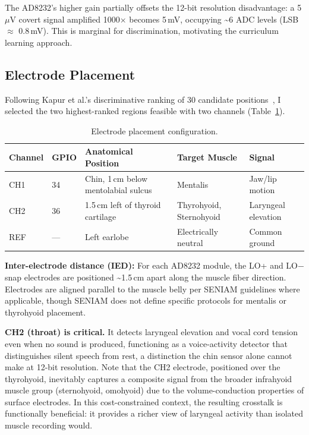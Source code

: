 \documentclass{article}
\begin{document}
The AD8232's higher gain partially offsets the 12-bit resolution disadvantage: a 5\,$\mu$V covert signal amplified 1000$\times$ becomes 5\,mV, occupying \textasciitilde6 ADC levels (LSB $\approx$ 0.8\,mV). This is marginal for discrimination, motivating the curriculum learning approach.

\subsection{Electrode Placement}

Following Kapur et al.'s discriminative ranking of 30 candidate positions~\cite{kapur2018}, I selected the two highest-ranked regions feasible with two channels (Table~\ref{tab:electrodes}).

\begin{table}[h]
\centering
\caption{Electrode placement configuration.}
\label{tab:electrodes}
\begin{tabular}{@{}lllll@{}}
\toprule
Channel & GPIO & Anatomical Position & Target Muscle & Signal \\
\midrule
CH1 & 34 & Chin, 1\,cm below mentolabial sulcus & Mentalis & Jaw/lip motion \\
CH2 & 36 & 1.5\,cm left of thyroid cartilage & Thyrohyoid, Sternohyoid & Laryngeal elevation \\
REF & --- & Left earlobe & Electrically neutral & Common ground \\
\bottomrule
\end{tabular}
\end{table}

\textbf{Inter-electrode distance (IED):} For each AD8232 module, the LO+ and LO$-$ snap electrodes are positioned \textasciitilde1.5\,cm apart along the muscle fiber direction. Electrodes are aligned parallel to the muscle belly per SENIAM guidelines where applicable, though SENIAM does not define specific protocols for mentalis or thyrohyoid placement.

\textbf{CH2 (throat) is critical.} It detects laryngeal elevation and vocal cord tension even when no sound is produced, functioning as a voice-activity detector that distinguishes silent speech from rest, a distinction the chin sensor alone cannot make at 12-bit resolution. Note that the CH2 electrode, positioned over the thyrohyoid, inevitably captures a composite signal from the broader infrahyoid muscle group (sternohyoid, omohyoid) due to the volume-conduction properties of surface electrodes. In this cost-constrained context, the resulting crosstalk is functionally beneficial: it provides a richer view of laryngeal activity than isolated muscle recording would.
\end{document}
